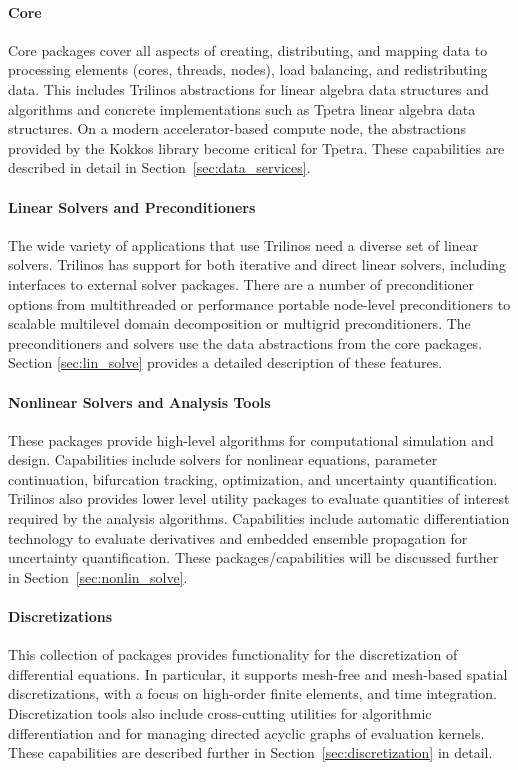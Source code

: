 \paragraph{Core} Core packages cover all aspects of creating, distributing, and mapping data to processing elements (cores, threads, nodes), load balancing, and redistributing data. This includes Trilinos abstractions for linear algebra data structures and algorithms and concrete implementations such as Tpetra linear algebra data structures. On a modern accelerator-based compute node, the abstractions provided by the Kokkos library become critical for Tpetra. These capabilities are described in detail in Section~\ref{sec:data_services}.

\paragraph{Linear Solvers and Preconditioners} The wide variety of applications that use Trilinos need a diverse set of linear solvers. Trilinos has support for both iterative and direct linear solvers, including interfaces to external solver packages. There are a number of preconditioner options from multithreaded or performance portable node-level preconditioners to scalable multilevel domain decomposition or multigrid preconditioners. The preconditioners and solvers use the data abstractions from the core packages. Section \ref{sec:lin_solve} provides a detailed description of these features.

\paragraph{Nonlinear Solvers and Analysis Tools} These packages provide high-level algorithms for computational simulation and design. Capabilities include solvers for nonlinear equations, parameter continuation, bifurcation tracking, optimization, and uncertainty quantification. Trilinos also provides lower level utility packages to evaluate quantities of interest required by the analysis algorithms. Capabilities include automatic differentiation technology to evaluate derivatives and embedded ensemble propagation for uncertainty quantification. These packages/capabilities will be discussed further in Section~\ref{sec:nonlin_solve}.

\paragraph{Discretizations} This collection of packages provides functionality for the discretization of differential equations. In particular, it supports mesh-free and mesh-based spatial discretizations, with a focus on high-order finite elements, and time integration. Discretization tools also include cross-cutting utilities for algorithmic differentiation and for managing directed acyclic graphs of evaluation kernels. These capabilities are described further in Section~\ref{sec:discretization} in detail.


